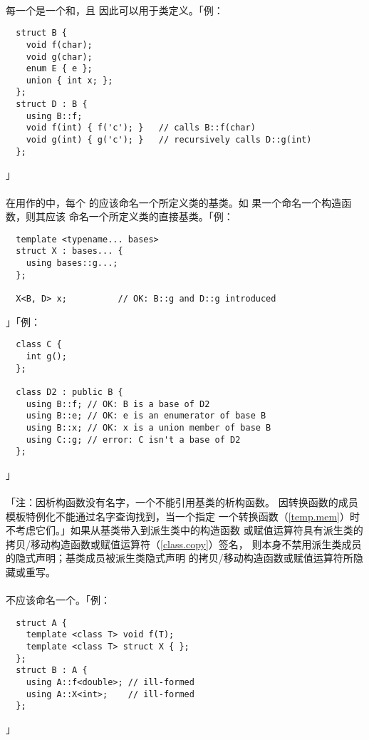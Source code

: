 \paragraph{}
每一个是一个和，且
因此可以用于类定义。「例：
\begin{lstlisting}
  struct B {
    void f(char);
    void g(char);
    enum E { e };
    union { int x; };
  };
  struct D : B {
    using B::f;
    void f(int) { f('c'); }   // calls B::f(char)
    void g(int) { g('c'); }   // recursively calls D::g(int)
  };
\end{lstlisting}」

\paragraph{}
在用作的中，每个
的应该命名一个所定义类的基类。如
果一个命名一个构造函数，则其应该
命名一个所定义类的直接基类。「例：
\begin{lstlisting}
  template <typename... bases>
  struct X : bases... {
    using bases::g...;
  };

  X<B, D> x;          // OK: B::g and D::g introduced
\end{lstlisting}」「例：
\begin{lstlisting}
  class C {
    int g();
  };

  class D2 : public B {
    using B::f; // OK: B is a base of D2
    using B::e; // OK: e is an enumerator of base B
    using B::x; // OK: x is a union member of base B
    using C::g; // error: C isn't a base of D2
  };
\end{lstlisting}」

\paragraph{}
「注：因析构函数没有名字，一个不能引用基类的析构函数。
因转换函数的成员模板特例化不能通过名字查询找到，当一个指定
一个转换函数（\ref{temp.mem}）时不考虑它们。」如果从基类带入到派生类中的构造函数
或赋值运算符具有派生类的拷贝/移动构造函数或赋值运算符（\ref{class.copy}）签名，
则本身不禁用派生类成员的隐式声明；基类成员被派生类隐式声明
的拷贝/移动构造函数或赋值运算符所隐藏或重写。

\paragraph{}
不应该命名一个。「例：
\begin{lstlisting}
  struct A {
    template <class T> void f(T);
    template <class T> struct X { };
  };
  struct B : A {
    using A::f<double>; // ill-formed
    using A::X<int>;    // ill-formed
  };
\end{lstlisting}」

